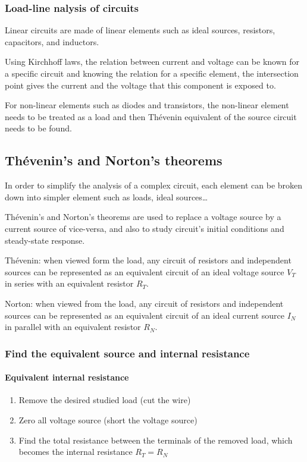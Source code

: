 \documentclass[10pt, twocolumn]{article}
\begin{document}
\subsubsection{Load-line nalysis of circuits}
Linear circuits are made of linear elements such as ideal sources, resistors, capacitors, and inductors.

Using Kirchhoff laws, the relation between current and voltage can be known for a specific circuit and knowing the relation for a specific element, the intersection point gives the current and the voltage that this component is exposed to.

For non-linear elements such as diodes and transistors, the non-linear element needs to be treated as a load and then Thévenin equivalent of the source circuit needs to be found.


\subsection{Thévenin's and Norton's theorems}
In order to simplify the analysis of a complex circuit, each element can be broken down into simpler element such as loads, ideal sources\dots{}

Thévenin's and Norton's theorems are used to replace a voltage source by a current source of vice-versa, and also to study circuit's initial conditions and steady-state response.


\begin{olddescription}
  \item[Thévenin:] when viewed form the load, any circuit of resistors and independent sources can be represented as an equivalent circuit of an ideal voltage source \(V_T\) in series with an equivalent resistor \(R_T\).
  \item[Norton:] when viewed from the load, any circuit of resistors and independent sources can be represented as an equivalent circuit of an ideal current source \(I_N\) in parallel with an equivalent resistor \(R_N\).
\end{olddescription}


\subsubsection{Find the equivalent source and internal resistance}

\paragraph{Equivalent internal resistance}
\begin{enumerate}
  \item Remove the desired studied load (cut the wire)
  \item Zero all voltage source (short the voltage source)
  \item Find the total resistance between the terminals of the removed load, which becomes the internal resistance \(R_T = R_N\)
\end{enumerate}
\end{document}
